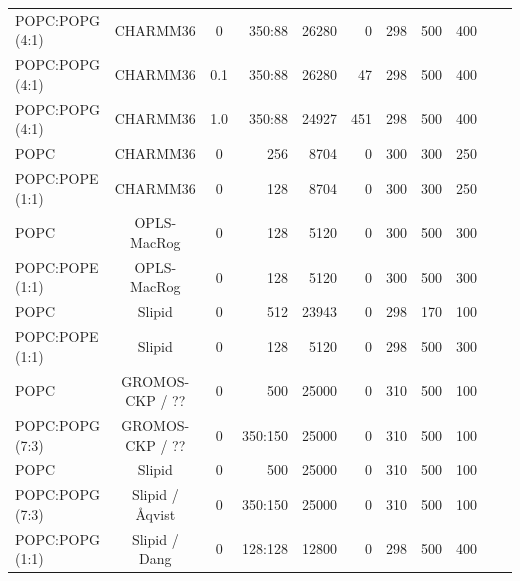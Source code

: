 \documentclass[journal=jpcbfk]{achemso}
\begin{document}
\begin{table}[htb]
\begin{minipage}[t]{\textwidth}
{\begin{tabular}{l c c r r r r r r c c}
      POPC:POPG (4:1)        & CHARMM36 \cite{klauda10,venable13}    & 0  & 350:88 & 26280 & 0  &  298  & 500 & 400 & \cite{CHARMM36POPCPOPG4010} \\
      POPC:POPG (4:1)        & CHARMM36 \cite{klauda10,venable13}    & 0.1 & 350:88 & 26280 & 47  &  298  & 500 & 400 & \cite{CHARMM36POPCPOPG4010100mMCaCl} \\
      POPC:POPG (4:1)        & CHARMM36 \cite{klauda10,venable13}    & 1.0 & 350:88 & 24927 & 451  &  298  & 500 & 400 & \cite{CHARMM36POPCPOPG40101000mMCaCl} \\
      \hline
      POPC             & CHARMM36 \cite{klauda10}        &0          & 256 & 8704 & 0  &  300  & 300 & 250 & \cite{POPCcharmm300K} \\
      POPC:POPE (1:1)  & CHARMM36 \cite{klauda10,venable13}         & 0  & 128 & 8704 & 0  &  300  & 300 & 250 & \cite{POPC1POPE1charmm36} \\
      \hline
      POPC             & OPLS-MacRog \cite{rog16}     &0           & 128 & 5120 & 0  &  300  & 500 & 300 & \cite{POPCmacrog300K} \\
      POPC:POPE (1:1)  & OPLS-MacRog \cite{rog16}     &0           & 128 & 5120 & 0  &  300  & 500 & 300 & \cite{POPC1POPE1macrogT300K} \\
      \hline
      POPC             & Slipid \cite{jambeck12b}     &0          & 512 & 23943 & 0  &  298  & 170 & 100 & \cite{POPCslipid298K} \\
      POPC:POPE (1:1)  & Slipid \cite{jambeck12b}     &0          & 128 & 5120  & 0  &  298  & 500 & 300 & \cite{POPC1POPE1slipidT298K} \\
     \hline
      POPC                   & GROMOS-CKP / ?? \cite{piggot12,??}  & 0  & 500     & 25000 & 0   &  310  & 500 & 100 & \cite{POPCgromosCKPT310K}  \\
      POPC:POPG (7:3)        & GROMOS-CKP / ?? \cite{piggot11,piggot12,??}  & 0  & 350:150 & 25000 & 0   &  310  & 500 & 100 & \cite{POPC7POPG3gromosCKPT310K} \\
     \hline
      POPC                   & Slipid \cite{jambeck12b}  & 0      & 500     & 25000 & 0   &  310  & 500 & 100 & \cite{POPCslipid301K}  \\
      POPC:POPG (7:3)        & Slipid / {\AA}qvist \cite{jambeck12b,aqvist90} & 0  & 350:150 & 25000 & 0   &  310  & 500 & 100 & \cite{slipidPOPC70POPG30T310K} \\
      POPC:POPG (1:1)        & Slipid / Dang \cite{jambeck12b,jambeck2012another,smith94,dang06} & 0  & 128:128 & 12800 & 0   &  298  & 500 & 400 & \cite{slipidPOPC50POPG50T298K} \\

\end{tabular}}
\end{minipage}
\end{table}
\end{document}
